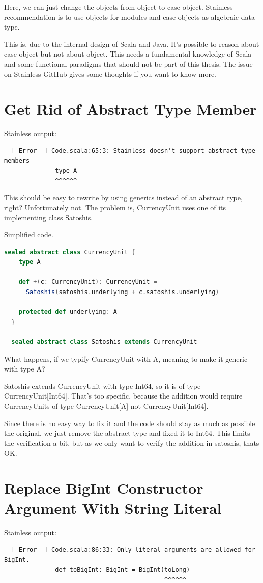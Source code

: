 Here, we can just change the objects from object to case object.
Stainless recommendation is to use objects for modules and case objects as algebraic data type.

This is, due to the internal design of Scala and Java.
It's possible to reason about case object but not about object.
This needs a fundamental knowledge of Scala and some functional paradigms that should not be part of this thesis.
The issue  on Stainless GitHub gives some thoughts if you want to know more.


\section{Get Rid of Abstract Type Member}

Stainless output:
{\footnotesize\begin{verbatim}
  [ Error  ] Code.scala:65:3: Stainless doesn't support abstract type members
              type A
              ^^^^^^
\end{verbatim}}

This should be easy to rewrite by using generics instead of an abstract type, right?
Unfortunately not.
The problem is, CurrencyUnit uses one of its implementing class Satoshis.

Simplified code.
\begin{lstlisting}[language=scala]
  sealed abstract class CurrencyUnit {
    type A

    def +(c: CurrencyUnit): CurrencyUnit =
      Satoshis(satoshis.underlying + c.satoshis.underlying)

    protected def underlying: A
  }

  sealed abstract class Satoshis extends CurrencyUnit
\end{lstlisting}

What happens, if we typify CurrencyUnit with A, meaning to make it generic with type A?

Satoshis extends CurrencyUnit with type Int64, so it is of type CurrencyUnit[Int64].
That's too specific, because the addition would require CurrencyUnits of type CurrencyUnit[A] not CurrencyUnit[Int64].

Since there is no easy way to fix it and the code should stay as much as possible the original, we just remove the abstract type and fixed it to Int64.
This limits the verification a bit, but as we only want to verify the addition in satoshis, thats OK.


\section{Replace BigInt Constructor Argument With String Literal}
Stainless output:
{\footnotesize\begin{verbatim}
  [ Error  ] Code.scala:86:33: Only literal arguments are allowed for BigInt.
              def toBigInt: BigInt = BigInt(toLong)
                                            ^^^^^^
\end{verbatim}}

